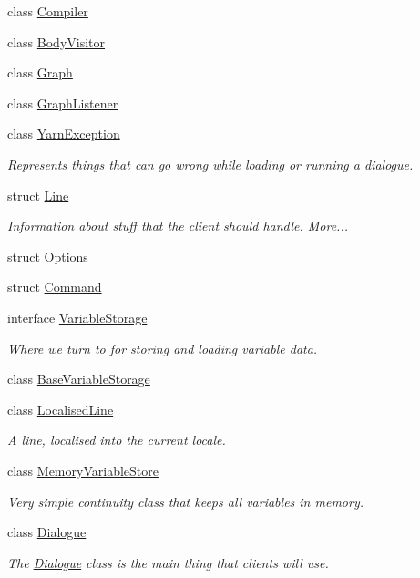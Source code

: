 \begin{DoxyCompactItemize}
\item 
class \hyperlink{a00051}{Compiler}
\item 
class \hyperlink{a00042}{Body\-Visitor}
\item 
class \hyperlink{a00103}{Graph}
\item 
class \hyperlink{a00104}{Graph\-Listener}
\item 
class \hyperlink{a00171}{Yarn\-Exception}
\begin{DoxyCompactList}\small\item\em Represents things that can go wrong while loading or running a dialogue. \end{DoxyCompactList}\item 
struct \hyperlink{a00048_a00349}{Line}
\begin{DoxyCompactList}\small\item\em Information about stuff that the client should handle.  \hyperlink{a00048_a00349}{More...}\end{DoxyCompactList}\item 
struct \hyperlink{a00048_a00352}{Options}
\item 
struct \hyperlink{a00048_a00346}{Command}
\item 
interface \hyperlink{a00167}{Variable\-Storage}
\begin{DoxyCompactList}\small\item\em Where we turn to for storing and loading variable data. \end{DoxyCompactList}\item 
class \hyperlink{a00041}{Base\-Variable\-Storage}
\item 
class \hyperlink{a00126}{Localised\-Line}
\begin{DoxyCompactList}\small\item\em A line, localised into the current locale. \end{DoxyCompactList}\item 
class \hyperlink{a00128}{Memory\-Variable\-Store}
\begin{DoxyCompactList}\small\item\em Very simple continuity class that keeps all variables in memory. \end{DoxyCompactList}\item 
class \hyperlink{a00088}{Dialogue}
\begin{DoxyCompactList}\small\item\em The \hyperlink{a00088}{Dialogue} class is the main thing that clients will use. \end{DoxyCompactList}\item 

\end{DoxyCompactItemize}
